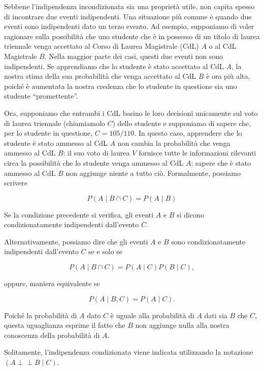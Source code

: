 \documentclass[
  11pt,
]{krantz}
\newcommand{\indep}{\perp \!\!\! \perp}
\theoremstyle{definition}
\theoremstyle{definition}
\theoremstyle{definition}
\theoremstyle{definition}
\theoremstyle{remark}
\begin{document}
Sebbene l'indipendenza incondizionata sia una proprietà utile, non capita spesso di incontrare due eventi indipendenti. Una situazione più comune è quando due eventi sono indipendenti dato un terzo evento. Ad esempio, supponiamo di voler ragionare sulla possibilità che uno studente che è in possesso di un titolo di laurea triennale venga accettato al Corso di Laurea Magistrale (CdL) \(A\) o al CdL Magistrale \(B\). Nella maggior parte dei casi, questi due eventi non sono indipendenti. Se apprendiamo che lo studente è stato accettato al CdL \(A\), la nostra stima della sua probabilità che venga accettato al CdL \(B\) è ora più alta, poiché è aumentata la nostra credenza che lo studente in questione sia uno studente ``promettente''.

Ora, supponiamo che entrambi i CdL basino le loro decisioni unicamente sul voto di laurea triennale (chiamiamolo \(C\)) dello studente e supponiamo di sapere che, per lo studente in questione, \(C = 105/110\). In questo caso, apprendere che lo studente è stato ammesso al CdL \(A\) non cambia la probabilità che venga ammesso al CdL \(B\): il suo voto di laurea \(V\) fornisce tutte le informazioni rilevanti circa la possibilità che lo studente venga ammesso al CdL \(A\); sapere che è stato ammesso al CdL \(B\) non aggiunge niente a tutto ciò. Formalmente, possiamo scrivere

\begin{equation}
P(A \mid B \cap C) = P(A \mid B)
\end{equation}

Se la condizione precedente si verifica, gli eventi \(A\) e \(B\) si dicono condizionatamente indipendenti dall'evento \(C\).

Alternativamente, possiamo dire che gli eventi \(A\) e \(B\) sono condizionatamente indipendenti dall'evento \(C\) se e solo se

\begin{equation}
P(A \mid B \cap C) = P(A \mid C) P(B \mid C),
\end{equation}

oppure, maniera equivalente se

\[
P(A \mid B, C)= P(A \mid C).
\]

Poiché la probabilità di \(A\) dato \(C\) è uguale alla probabilità di \(A\) dati sia \(B\) che \(C\), questa uguaglianza esprime il fatto che \(B\) non aggiunge nulla alla nostra conoscenza della probabilità di \(A\).

Solitamente, l'indipendenza condizionata viene indicata utilizzando la notazione \((A \indep B \mid C)\).
\end{document}
